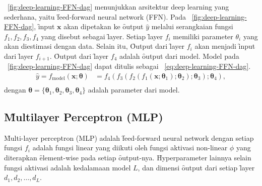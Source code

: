     \pic~\ref{fig:deep-learning-FFN-dag} menunjukkan arsitektur deep learning yang sederhana, yaitu \f{feed-forward neural network} (FFN). Pada \pic~\ref{fig:deep-learning-FFN-dag}, \f{input} $\mathbf{x}$ akan dipetakan ke \f{output} $\hat y$ melalui serangkaian fungsi $f_1, f_2, f_3,f_4$ yang disebut sebagai \f{layer}. Setiap \f{layer} $f_i$ memiliki parameter $\theta_i$ yang akan diestimasi dengan data. Selain itu, \f{Output} dari \f{layer} $f_i$ akan menjadi \f{input} dari \f{layer} $f_{i+1}$. \f{Output} dari \f{layer} $f_4$ adalah \f{output} dari model. Model pada \pic~\ref{fig:deep-learning-FFN-dag} dapat ditulis sebagai \equ~\ref{eq:deep-learning-FFN-dag}.
    \begin{align}
        \label{eq:deep-learning-FFN-dag}
        \hat y = f_{\text{model}}(\mathbf{x}; \bm{\theta}) &= f_4(f_3(f_2(f_1(\mathbf{x}; \bm{\theta}_1); \bm{\theta}_2); \bm{\theta}_3); \bm{\theta}_4), \\
        \label{eq:deep-learning-FFN-dag-end}
    \end{align}
    dengan $\bm{\theta} = \{\bm{\theta}_1, \bm{\theta}_2, \bm{\theta}_3, \bm{\theta}_4\}$ adalah parameter dari model.

    \subsection{\f{Multilayer Perceptron} (MLP)}

    \f{Multi-layer perceptron} (MLP) adalah \f{feed-forward neural network} dengan setiap fungsi $f_i$ adalah fungsi linear yang diikuti oleh fungsi aktivasi non-linear $\phi$  yang diterapkan \f{element-wise} pada setiap \f{output}-nya. \f{Hyperparameter} lainnya selain fungsi aktivasi adalah kedalamaan model $L$, dan dimensi \f{output} dari setiap \f{layer} $d_1, d_2, \dots, d_L$.

